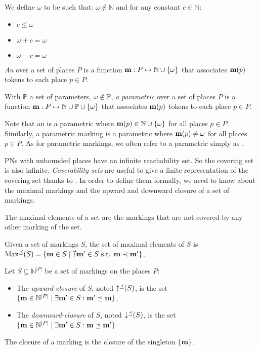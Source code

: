 \begin{defi}[\omark]
  We define $\omega$ to be such that:
  $\omega \notin \mathbb{N}$
  and for any constant $c \in \mathbb{N}$:
  \begin{itemize}
    \item $c \leq \omega$
    \item $\omega + c = \omega$
    \item $\omega - c = \omega$
  \end{itemize}

  \emph{An \omark} \mar over a set of places $P$ is a function $\mathbf{m} : P \mapsto \mathbb{N} \cup \{\omega\}$ that associates $\mathbf{m}(p)$ tokens to each place $p \in P$.

  With $\mathbb{P}$ a set of parameters, $\omega \notin \mathbb{P}$,
  \emph{a parametric \omark} \mar over a set of places $P$ is a function $\mathbf{m} : P \mapsto \mathbb{N} \cup \mathbb{P} \cup \{\omega\}$ that associates $\mathbf{m}(p)$ tokens to each place $p \in P$.
\end{defi}

Note that an \omark \mar is a parametric \omark where $\mathbf{m}(p) \in \mathbb{N} \cup \{\omega\}$ for all places $p \in P$.
Similarly, a parametric marking \mar is a parametric \omark where $\mathbf{m}(p) \neq \omega$ for all places $p \in P$.
As for parametric markings, we often refer to a parametric \omark simply as \omark.

\acp{PN} with unbounded places have an infinite reachability set.
So the covering set is also infinite.
\emph{Coverability sets} are useful to give a finite representation of the covering set thanks to \omark.
In order to define them formally, we need to know about the maximal markings and the upward and downward closure of a set of markings.

The maximal elements of a set are the markings that are not covered by any other marking of the set.
\begin{defi}
  Given a set of markings $S$, the set of maximal elements of $S$ is
  $\operatorname{Max^\preceq}(S) = \{ \mathbf{m} \in S \mid \nexists \mathbf{m'} \in S \text{ s.t. } \mathbf{m} \prec \mathbf{m'} \}$.
\end{defi}

\begin{defi}
  Let $S \subseteq \mathbb{N}^{|P|}$ be a set of markings on the places $P$:
  \begin{itemize}
    \item The \emph{upward-closure} of $S$, noted $\operatorname{\uparrow^\preceq}(S)$, is the set
      $\{\mathbf{m} \in \mathbb{N}^{|P|} \mid \exists \mathbf{m'} \in S : \mathbf{m'} \preceq \mathbf{m}\}$,
    \item The \emph{downward-closure} of $S$, noted $\operatorname{\downarrow^\preceq}(S)$, is the set
      $\{\mathbf{m} \in \mathbb{N}^{|P|} \mid \exists \mathbf{m'} \in S : \mathbf{m} \preceq \mathbf{m'}\}$.
  \end{itemize}
  The closure of a marking \mar is the closure of the singleton $\{\mathbf{m}\}$.
\end{defi}

